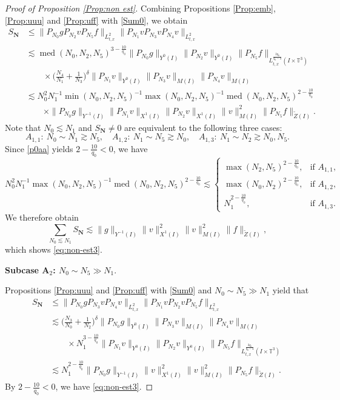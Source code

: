 \documentclass[letterpaper, 11pt,  reqno]{amsart}
\DeclareMathOperator{\med}{med}
\newcommand{\1}{\hspace{0.5mm}\text{I}\hspace{0.5mm}}
\newcommand{\noi}{\noindent}
\newcommand{\T}{\mathbb{T}}
\newcommand{\wt}{\widetilde}
\newcommand{\les}{\lesssim}
\newcommand{\ges}{\gtrsim}
\newcommand{\Nb}{\mathbf{N}}
\numberwithin{equation}{section}
\numberwithin{theorem}{section}
\begin{document}
\begin{proof}[Proof of Proposition \ref{Prop:non est}]
Combining Propositions \ref{Prop:emb}, \ref{Prop:uuu} and \ref{Prop:uff} with \eqref{Sum0}, we obtain \begin{align*}
S_{\Nb}
&\le
\|P_{N_0}g P_{N_2} v P_{N_5}f \|_{L_{t,x}^2}
\|P_{N_1}v P_{N_3}v P_{N_4}v\|_{L_{t,x}^2}
\\
&\les
\med(N_0,N_2,N_5)^{3-\frac{10}{q_0}}
\|P_{N_0}g\|_{Y^0(I)}
\|P_{N_2}v\|_{Y^0(I)}
\|P_{N_5}f\|_{L_{t,x}^{\frac{2q_0}{q_0-4}}(I \times \T^3)}
\\
&\qquad
\times
\Big(\frac{N_4}{N_1}+\frac{1}{N_3}\Big)^\delta
\|P_{N_1}v\|_{Y^0(I)}
\|P_{N_3}v\|_{M(I)}
\|P_{N_4}v\|_{M(I)}
\\
&\les
N_0^2 N_1^{-1}
\min(N_0,N_2,N_5)^{-1}
\max(N_0,N_2,N_5)^{-1}
\med(N_0,N_2,N_5)^{2-\frac{10}{q_0}}
\\
&\qquad
\times
\|P_{N_0} g \|_{Y^{-1}(I)}
\| P_{N_1} v \|_{X^1(I)}
\| P_{N_2} v \|_{X^1(I)}
\| v \|_{M(I)}^2
\| P_{N_5} f \|_{\wt Z(I)}
.
\end{align*}
Note that $N_0 \les N_1$ and $S_{\Nb} \neq 0$ are equivalent to
the following three cases:
\[
A_{1,1}:
\
N_0 \sim N_1 \ges N_5, \quad
A_{1,2}:
\
N_1 \sim N_5 \ges N_0, \quad
A_{1,3}:
\
N_1 \sim N_2 \ges N_0, N_5.
\]
Since
\eqref{p0aa} yields
$2-\frac{10}{q_0}<0$,
we have
\[
N_0^2 N_1^{-1}
\max(N_0,N_2,N_5)^{-1}
\med(N_0,N_2,N_5)^{2-\frac{10}{q_0}}
\les
\begin{cases}
\max (N_2,N_5)^{2-\frac{10}{q_0}},
& \text{if } A_{1,1}, \\
\max (N_0,N_2)^{2-\frac{10}{q_0}},
& \text{if } A_{1,2}, \\
N_1^{2-\frac{10}{q_0}},
& \text{if } A_{1,3}.
\end{cases}
\]
We therefore obtain
\[
\sum_{N_0 \les N_1} S_\Nb
\les
\| g \|_{Y^{-1}(I)}
\| v \|_{X^1(I)}^2
\| v \|_{M(I)}^2
\| f \|_{\wt Z(I)},
\]
which shows  \eqref{eq:non-est3}.



\medskip
\noi
{\bf Subcase A$_2$: $N_0\sim N_5\gg N_1$}. 
\smallskip


Propositions \ref{Prop:uuu} and \ref{Prop:uff} with \eqref{Sum0} and $N_0\sim N_5\gg N_1$ yield that
\begin{align*}
S_{\Nb}
&\le
\|P_{N_0} g P_{N_3}v P_{N_4}v \|_{L_{t,x}^2}
\| P_{N_1}v P_{N_2}v P_{N_5}f\|_{L_{t,x}^2}
\\
&\les
\Big(\frac{N_3}{N_0}+\frac{1}{N_2}\Big)^\delta
\|P_{N_0} g \|_{Y^0(I)}
\|P_{N_3}v\|_{M(I)}
\|P_{N_4}v\|_{M(I)}
\\
&\qquad
\times
N_1^{3-\frac{10}{q_0}}
\|P_{N_1}v\|_{Y^0(I)}
\|P_{N_2}v\|_{Y^0(I)}
\|P_{N_5}f\|_{L_{t,x}^{\frac{2q_0}{q_0-4}}(I \times \T^3)}
\\
&\les
N_1^{2-\frac{10}{q_0}}
\|P_{N_0} g\|_{Y^{-1}(I)}
\| v \|_{X^1(I)}^2
\| v \|_{M(I)}^2
\| P_{N_5} f \|_{\wt Z(I)}
.
\end{align*}
By $2-\frac{10}{q_0}<0$,
we have \eqref{eq:non-est3}.



\end{proof}
\end{document}
